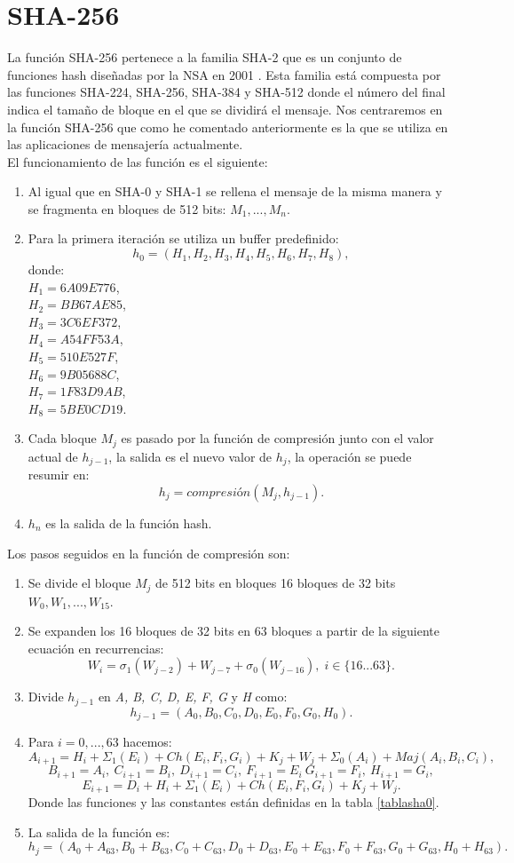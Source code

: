 \section{SHA-256}
La función SHA-256 pertenece a la familia SHA-2 que es un conjunto de funciones hash diseñadas por la NSA en 2001 \cite{Penard2008}. Esta familia está compuesta por las funciones SHA-224, SHA-256, SHA-384 y SHA-512 donde el número del final indica el tamaño de bloque en el que se dividirá el mensaje. Nos centraremos en la función SHA-256 que como he comentado anteriormente es la que se utiliza en las aplicaciones de mensajería actualmente.\\
El funcionamiento de las función es el siguiente\cite{Function2016}:\\
\begin{enumerate}
	\item Al igual que en SHA-0 y SHA-1 se rellena el mensaje de la misma manera y se fragmenta en bloques de 512 bits: $M_1,...,M_n$.
	\item Para la primera iteración se utiliza un buffer predefinido:
	$$
		h_0=(H_1, H_2, H_3, H_4, H_5, H_6, H_7, H_8),
	$$
	donde:\\
	$H_1=6A09E776$,\\
	$H_2=BB67AE85$,\\
	$H_3=3C6EF372$,\\
	$H_4=A54FF53A$,\\
	$H_5=510E527F$,\\
	$H_6=9B05688C$,\\
	$H_7=1F83D9AB$,\\
	$H_8=5BE0CD19$.\\
	\item Cada bloque $M_j$ es pasado por la función de compresión junto con el valor actual de $h_{j-1}$, la salida es el nuevo valor de $h_j$, la operación se puede resumir en:
	$$
		h_j=compresión(M_j,h_{j-1}).
	$$
	\item $h_n$ es la salida de la función hash.
\end{enumerate}
Los pasos seguidos en la función de compresión son:
\begin{enumerate}
	\item Se divide el bloque $M_j$ de 512 bits en bloques 16 bloques de 32 bits $W_0,W_1,...,W_{15}$. 
	\item Se expanden los 16 bloques de 32 bits en 63 bloques a partir de la siguiente ecuación en recurrencias:
	$$
		W_i=\sigma_1(W_{j-2})+W_{j-7}+\sigma_0(W_{j-16}),\; i \in \{16...63\}.
	$$
	\item Divide $h_{j-1}$ en \emph{A, B, C, D, E, F, G} y \emph{H} como:
	$$
		h_{j-1} = (A_0, B_0, C_0, D_0, E_0, F_0, G_0, H_0).
	$$
	\item Para $i=0,...,63$ hacemos:
	$$
		A_{i+1}=H_i+\Sigma_1(E_i)+Ch(E_i,F_i,G_i)+K_j+W_j+\Sigma_0(A_i)+Maj(A_i,B_i,C_i),
	$$
	$$
		B_{i+1}=A_i,\: C_{i+1}=B_i,\: D_{i+1}=C_i,\: F_{i+1}=E_i\: G_{i+1}=F_i,\: H_{i+1}=G_i,
	$$
	$$
		E_{i+1}=D_i+H_i+\Sigma_1(E_i)+Ch(E_i,F_i,G_i)+K_j+W_j.
	$$
	Donde las funciones y las constantes están definidas en la tabla \ref{tablasha0}.
	\item La salida de la función es:
	$$
		h_j=(A_0+A_{63}, B_0+B_{63}, C_0+C_{63}, D_0+D_{63}, E_0+E_{63}, F_0+F_{63}, G_0+G_{63}, H_0+H_{63}).
	$$
\end{enumerate}
